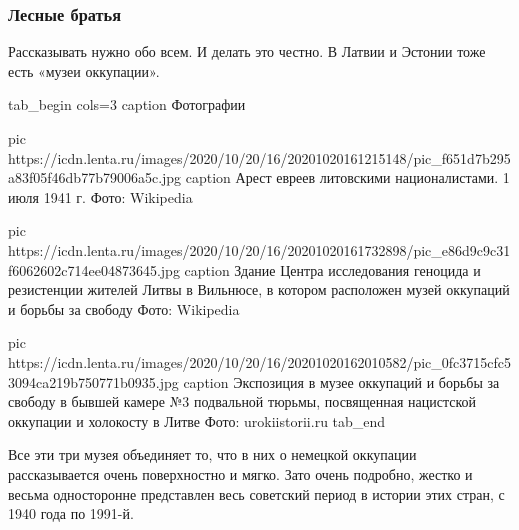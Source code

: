  
 
 
 
 
\subsubsection{Лесные братья}


Рассказывать нужно обо всем. И делать это честно. В Латвии и Эстонии тоже есть
«музеи оккупации».

\ifcmt
tab_begin cols=3
	caption Фотографии 

	pic https://icdn.lenta.ru/images/2020/10/20/16/20201020161215148/pic_f651d7b295a83f05f46db77b79006a5c.jpg
	caption Арест евреев литовскими националистами. 1 июля 1941 г.  Фото: Wikipedia

	pic https://icdn.lenta.ru/images/2020/10/20/16/20201020161732898/pic_e86d9c9c31f6062602c714ee04873645.jpg
	caption Здание Центра исследования геноцида и резистенции жителей Литвы в Вильнюсе, в котором расположен музей оккупаций и борьбы за свободу Фото: Wikipedia

	pic https://icdn.lenta.ru/images/2020/10/20/16/20201020162010582/pic_0fc3715cfc53094ca219b750771b0935.jpg
	caption Экспозиция в музее оккупаций и борьбы за свободу в бывшей камере №3 подвальной тюрьмы, посвященная нацистской оккупации и холокосту в Литве Фото: urokiistorii.ru
tab_end
\fi

Все эти три музея объединяет то, что в них о немецкой оккупации рассказывается
очень поверхностно и мягко. Зато очень подробно, жестко и весьма односторонне
представлен весь советский период в истории этих стран, с 1940 года по 1991-й.

